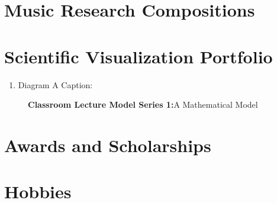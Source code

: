 \documentclass{ResumeDesignFormat1}
\begin{document}
\section{Music Research Compositions}

\begin{enumerate}
\end{enumerate}

\section{Scientific Visualization Portfolio}

\begin{enumerate}
\item Diagram A \textcolor{c4}{Caption:}
\end{enumerate}
\footnotesize
\begin{figure}[h]
\centering
\caption{\textcolor{c5}{\textbf{Classroom Lecture Model Series 1:}}\footnotesize  A Mathematical Model}
\label{fig:Figure1}
\end{figure}

\section{Awards and Scholarships}

\begin{enumerate}
\end{enumerate}
\section{Hobbies}

\begin{enumerate}
\end{enumerate}
\end{document}
